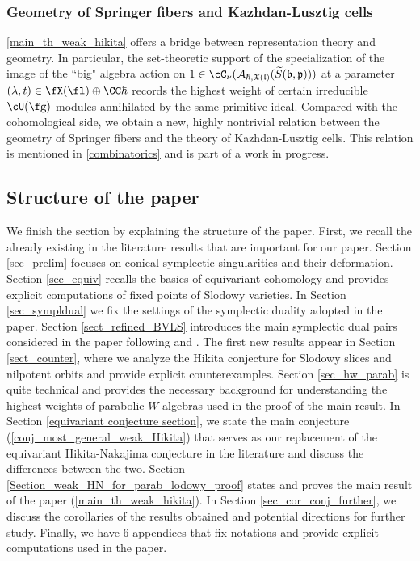 \documentclass[12pt]{amsart}
\begin{document}
    
\subsubsection{Geometry of Springer fibers and Kazhdan-Lusztig cells}  
\cref{main_th_weak_hikita} offers a bridge between representation theory and geometry. In particular, the set-theoretic support of the specialization of the image of the ``big" algebra action on $1\in \cC_\nu(\mathcal{A}_{\hbar,\mathfrak{X}(\mathfrak{l})}(\widetilde{S}(\mathfrak{b},\mathfrak{p}))) $ at a parameter $(\lambda, t)\in \fX(\fl)\oplus \CC \hbar$ records the highest weight of certain irreducible $\cU(\fg)$-modules annihilated by the same primitive ideal. Compared with the cohomological side, we obtain a new, highly nontrivial relation between the geometry of Springer fibers and the theory of Kazhdan-Lusztig cells. This relation is mentioned in \cref{combinatorics} and is part of a work in progress.

 \subsection{Structure of the paper}   We finish the section by explaining the structure of the paper. First, we recall the already existing in the literature results that are important for our paper. Section \ref{sec_prelim} focuses on conical symplectic singularities and their deformation. Section \ref{sec_equiv} recalls the basics of equivariant cohomology and provides explicit computations of fixed points of Slodowy varieties. In Section \ref{sec_sympldual} we fix the settings of the symplectic duality adopted in the paper. Section \ref{sect_refined_BVLS} introduces the main symplectic dual pairs considered in the paper following \cite{LMBM} and \cite{BPWII}. The first new results appear in Section \ref{sect_counter}, where we analyze the Hikita conjecture for Slodowy slices and nilpotent orbits and provide explicit counterexamples. Section \ref{sec_hw_parab} is quite technical and provides the necessary background for understanding the highest weights of parabolic $W$-algebras used in the proof of the main result. In Section \ref{equivariant conjecture section}, we state the main conjecture (\cref{conj_most_general_weak_Hikita}) that serves as our replacement of the equivariant Hikita-Nakajima conjecture in the literature and discuss the differences between the two. Section \ref{Section_weak_HN_for_parab_lodowy_proof} states and proves the main result of the paper (\cref{main_th_weak_hikita}). In Section \ref{sec_cor_conj_further}, we discuss the corollaries of the results obtained and potential directions for further study. Finally, we have 6 appendices that fix notations and provide explicit computations used in the paper.
\end{document}
